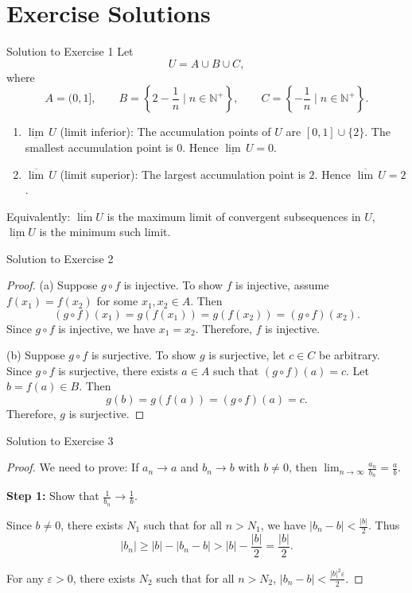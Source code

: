 \documentclass[dvipsnames]{beamer}
\theoremstyle{plain}
\theoremstyle{definition}
\begin{document}
\section{Exercise Solutions}
\begin{frame}{Solution to Exercise 1}
Let 
\[
U = A \cup B \cup C,
\]
where 
\[
A = (0,1],\qquad 
B = \left\{2-\frac{1}{n} \mid n\in\mathbb{N}^+\right\},\qquad 
C = \left\{-\frac{1}{n} \mid n\in\mathbb{N}^+\right\}.
\]

\begin{enumerate}
    \item $\underline{\lim}\,U$ (limit inferior): The accumulation points of $U$ are $[0,1]\cup\{2\}$. The smallest accumulation point is $0$. Hence $\boxed{\underline{\lim}\,U = 0}$.
    \item $\overline{\lim}\,U$ (limit superior): The largest accumulation point is $2$. Hence $\boxed{\overline{\lim}\,U = 2}$.
\end{enumerate}
\vspace{0.5em}
Equivalently: $\overline{\lim}U$ is the maximum limit of convergent subsequences in $U$, $\underline{\lim}U$ is the minimum such limit.
\end{frame}

\begin{frame}{Solution to Exercise 2}
\begin{proof}
(a) Suppose \(g \circ f\) is injective. To show \(f\) is injective, assume \(f(x_1) = f(x_2)\) for some \(x_1, x_2 \in A\). Then
\[
(g \circ f)(x_1) = g(f(x_1)) = g(f(x_2)) = (g \circ f)(x_2).
\]
Since \(g \circ f\) is injective, we have \(x_1 = x_2\). Therefore, \(f\) is injective.

\vspace{0.3cm}

(b) Suppose \(g \circ f\) is surjective. To show \(g\) is surjective, let \(c \in C\) be arbitrary. Since \(g \circ f\) is surjective, there exists \(a \in A\) such that \((g \circ f)(a) = c\). Let \(b = f(a) \in B\). Then
\[
g(b) = g(f(a)) = (g \circ f)(a) = c.
\]
Therefore, \(g\) is surjective.
\end{proof}
\end{frame}

\begin{frame}{Solution to Exercise 3}
\begin{proof}
We need to prove: If \(a_n \to a\) and \(b_n \to b\) with \(b \neq 0\), then \(\displaystyle \lim_{n \to \infty} \frac{a_n}{b_n} = \frac{a}{b}\).

\vspace{0.2cm}

\textbf{Step 1:} Show that \(\displaystyle \frac{1}{b_n} \to \frac{1}{b}\).

Since \(b \neq 0\), there exists \(N_1\) such that for all \(n > N_1\), we have \(|b_n - b| < \frac{|b|}{2}\). Thus
\[
|b_n| \ge |b| - |b_n - b| > |b| - \frac{|b|}{2} = \frac{|b|}{2}.
\]

For any \(\varepsilon > 0\), there exists \(N_2\) such that for all \(n > N_2\), \(|b_n - b| < \frac{|b|^2 \varepsilon}{2}\).
\end{proof}
\end{frame}
\end{document}
